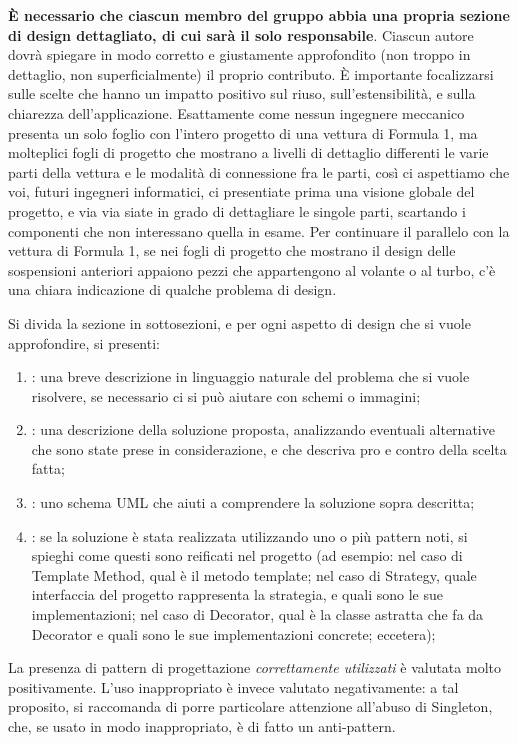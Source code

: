 \documentclass[a4paper,12pt]{report}
\begin{document}
\textbf{È necessario che ciascun membro del gruppo abbia una propria sezione di design dettagliato,
	di cui sarà il solo responsabile}.
%
Ciascun autore dovrà spiegare in modo corretto e giustamente approfondito (non troppo in dettaglio, non superficialmente) il proprio contributo.
%
È importante focalizzarsi sulle scelte che hanno un impatto positivo sul riuso, sull'estensibilità, e sulla chiarezza dell'applicazione.
%
Esattamente come nessun ingegnere meccanico presenta un solo foglio con l'intero progetto di una vettura di Formula 1, ma molteplici fogli di progetto che mostrano a livelli di dettaglio differenti le varie parti della vettura e le modalità di connessione fra le parti, così ci aspettiamo che voi, futuri ingegneri informatici, ci presentiate prima una visione globale del progetto, e via via siate in grado di dettagliare le singole parti, scartando i componenti che non interessano quella in esame.
%
Per continuare il parallelo con la vettura di Formula 1, se nei fogli di progetto che mostrano il
design delle sospensioni anteriori appaiono pezzi che appartengono al volante o al turbo, c'è una
chiara indicazione di qualche problema di design.

Si divida la sezione in sottosezioni, e per ogni aspetto di design che si vuole approfondire, si presenti:
\begin{enumerate}
	\item: una breve descrizione in linguaggio naturale del problema che si vuole risolvere, se necessario ci si può aiutare con schemi o immagini;
	\item: una descrizione della soluzione proposta, analizzando eventuali alternative che sono state prese in considerazione, e che descriva pro e contro della scelta fatta;
	\item: uno schema UML che aiuti a comprendere la soluzione sopra descritta;
	\item: se la soluzione è stata realizzata utilizzando uno o più pattern noti, si spieghi come questi sono reificati nel progetto
	(ad esempio: nel caso di Template Method, qual è il metodo template;
	nel caso di Strategy, quale interfaccia del progetto rappresenta la strategia, e quali sono le sue implementazioni;
	nel caso di Decorator, qual è la classe astratta che fa da Decorator e quali sono le sue implementazioni concrete; eccetera);
\end{enumerate}
%
La presenza di pattern di progettazione \emph{correttamente utilizzati} è valutata molto positivamente.
%
L'uso inappropriato è invece valutato negativamente: a tal proposito, si raccomanda di porre particolare attenzione all'abuso di Singleton, che, se usato in modo inappropriato, è di fatto un anti-pattern.
%
\end{document}
